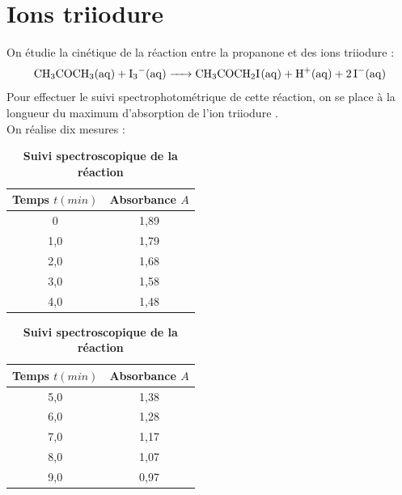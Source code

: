 \documentclass[a4paper,11pt,fleqn]{article}%
\begin{document}
\maketitle
\section{Ions triiodure}
On étudie la cinétique de la réaction entre la propanone et des ions triiodure :
$$\ce{CH3COCH3(aq) + I_3-(aq) -> CH3COCH2I(aq) + H+(aq) +2I-(aq)}$$
Pour effectuer le suivi spectrophotométrique de cette réaction, on se place à la longueur du maximum d'absorption de l'ion triiodure .\\
On réalise dix mesures :

\begin{table}[h!]
    \centering
    \begin{tabular}{|c|c|}
        \hline \textbf{Temps $t (min)$} & \textbf{Absorbance $A$}\\
        \hline 0 & 1,89\\
        \hline 1,0 & 1,79\\
        \hline 2,0 & 1,68\\
        \hline 3,0 & 1,58\\
        \hline  4,0 & 1,48\\
        \hline
    \end{tabular}
    \begin{tabular}{|c|c|}
        \hline \textbf{Temps $t (min)$} & \textbf{Absorbance $A$}\\
        \hline 5,0 & 1,38\\
        \hline 6,0 & 1,28\\
        \hline 7,0 & 1,17\\
        \hline 8,0 & 1,07\\
        \hline 9,0 & 0,97\\
        \hline
    \end{tabular}
    \caption*{\textbf{Suivi spectroscopique de la réaction}}
\end{table}
\end{document}
